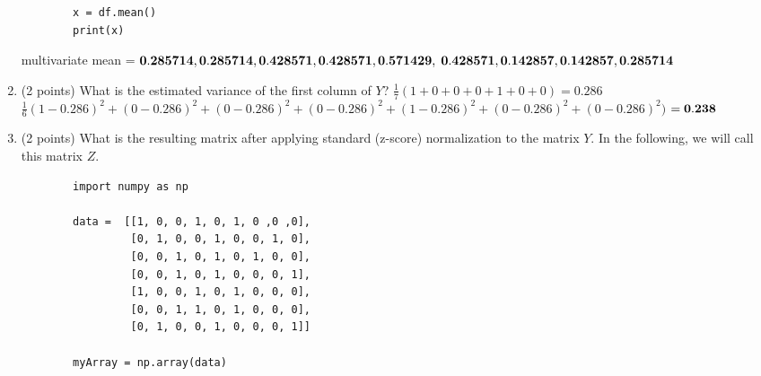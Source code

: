 \documentclass[11pt]{article}
\begin{document}
\begin{enumerate}
\begin{lstlisting}
        x = df.mean()
        print(x)
    \end{lstlisting}
    \newline multivariate mean = $\bf0.285714, 0.285714, 0.428571, 0.428571, 0.571429,$
    \newline $\bf0.428571, 0.142857, 0.142857, 0.285714$
    \item (2 points) What is the estimated variance of the first column of $Y$?
    \newline$\frac{1}{7}(1+0+0+0+1+0+0) = 0.286$
    \newline$\frac{1}{6}(1-0.286)^2+(0-0.286)^2+(0-0.286)^2+(0-0.286)^2+(1-0.286)^2+(0-0.286)^2+(0-0.286)^2)$
    \newline$= \bf0.238$
    \newpage
    \item (2 points) What is the resulting matrix after applying standard
    (z-score) normalization to the matrix $Y$.  In the following, we will call
    this matrix $Z$.
    \newline 
    \newline \begin{lstlisting}
        import numpy as np
                
        data =  [[1, 0, 0, 1, 0, 1, 0 ,0 ,0],
                 [0, 1, 0, 0, 1, 0, 0, 1, 0],
                 [0, 0, 1, 0, 1, 0, 1, 0, 0],
                 [0, 0, 1, 0, 1, 0, 0, 0, 1],
                 [1, 0, 0, 1, 0, 1, 0, 0, 0],
                 [0, 0, 1, 1, 0, 1, 0, 0, 0],
                 [0, 1, 0, 0, 1, 0, 0, 0, 1]]
                
        myArray = np.array(data)       
        

\end{lstlisting}
\end{enumerate}
\end{document}
